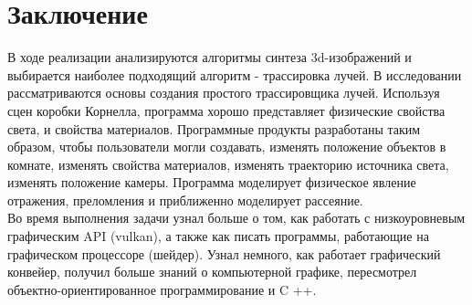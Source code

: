 \chapter*{Заключение}

В ходе реализации анализируются алгоритмы синтеза 3d-изображений
и выбирается наиболее подходящий алгоритм - трассировка лучей.
В исследовании рассматриваются основы создания простого трассировщика лучей.
Используя сцен коробки Корнелла, программа хорошо представляет физические свойства света, и свойства материалов.
Программные продукты разработаны таким образом, чтобы пользователи
могли создавать, изменять положение объектов в комнате, изменять свойства материалов,
изменять траекторию источника света, изменять положение камеры.
Программа моделирует физическое явление отражения, преломления и приближенно моделирует рассеяние.
\\

Во время выполнения задачи узнал больше о том, как работать с низкоуровневым графическим API
(vulkan), а также как писать программы, работающие на графическом процессоре (шейдер).
Узнал немного, как работает графический конвейер, получил больше знаний о компьютерной графике,
пересмотрел объектно-ориентированное программирование и C ++.
